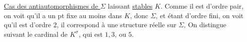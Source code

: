 \uline{Cas des antiautomorphismes de \(\Sigma\)} \inserted{\(\sigma\)} laissant \uline{stables} \(K\).  Comme il est d’ordre pair, on voit qu’il  a un pt fixe au moins dans \(K\),  donc \(\Sigma\), et étant d’ordre fini, on voit qu’il est d’ordre \(2\), il correspond à une structure réelle sur \(\Sigma\), 
On distingue suivant le cardinal de \(K^\sigma\), qui est \(1,3\), ou \(5\).
